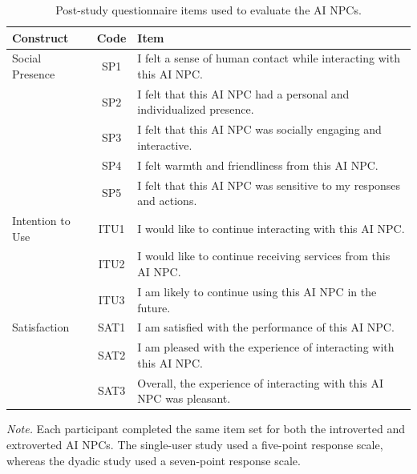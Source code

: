 \documentclass[a4paper,fleqn]{cas-sc}
\begin{document}
\begin{table}[t]
\centering
\footnotesize
\caption{Post-study questionnaire items used to evaluate the AI NPCs.}
\label{tab:app-posttest}
\begin{tabular}{p{}c p{}}
\toprule
\textbf{Construct} &
\textbf{Code} &
\textbf{Item} \\
\midrule

Social Presence
& SP1
& I felt a sense of human contact while interacting with this AI NPC. \\

& SP2
& I felt that this AI NPC had a personal and individualized presence. \\

& SP3
& I felt that this AI NPC was socially engaging and interactive. \\

& SP4
& I felt warmth and friendliness from this AI NPC. \\

& SP5
& I felt that this AI NPC was sensitive to my responses and actions. \\

\addlinespace

Intention to Use
& ITU1
& I would like to continue interacting with this AI NPC. \\

& ITU2
& I would like to continue receiving services from this AI NPC. \\

& ITU3
& I am likely to continue using this AI NPC in the future. \\

\addlinespace

Satisfaction
& SAT1
& I am satisfied with the performance of this AI NPC. \\

& SAT2
& I am pleased with the experience of interacting with this AI NPC. \\

& SAT3
& Overall, the experience of interacting with this AI NPC was pleasant. \\

\bottomrule
\end{tabular}

\vspace{2mm}
\begin{minipage}{0.95\textwidth}
\footnotesize
\textit{Note.} Each participant completed the same item set for both the introverted and extroverted AI NPCs. 
The single-user study used a five-point response scale, whereas the dyadic study used a seven-point response scale.
\end{minipage}
\end{table}
\end{document}
